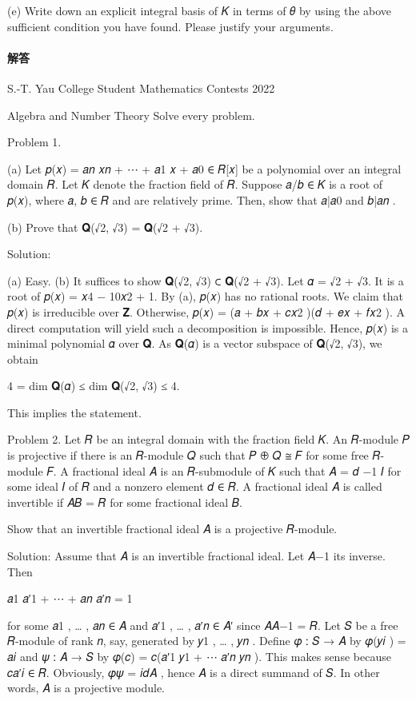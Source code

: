 \documentclass[UTF8,12pt]{ctexart}
\begin{document}
(e) Write down an explicit integral basis of 𝐾 in terms of 𝜃 by using the above sufficient condition you have found. Please justify your arguments.

\paragraph{解答}

S.-T. Yau College Student Mathematics Contests 2022

Algebra and Number Theory Solve every problem.

Problem 1.

(a) Let 𝑝(𝑥) = 𝑎𝑛 𝑥𝑛 + ⋯ + 𝑎1 𝑥 + 𝑎0 ∈ 𝑅[𝑥] be a polynomial over an integral domain 𝑅. Let 𝐾 denote the fraction field of 𝑅. Suppose 𝑎/𝑏 ∈ 𝐾 is a root of 𝑝(𝑥), where 𝑎, 𝑏 ∈ 𝑅 and are relatively prime. Then, show that 𝑎|𝑎0 and 𝑏|𝑎𝑛 .

(b) Prove that 𝐐(√2, √3) = 𝐐(√2 + √3).

Solution:

(a) Easy. (b) It suffices to show 𝐐(√2, √3) ⊂ 𝐐(√2 + √3). Let 𝛼 = √2 + √3. It is a root of 𝑝(𝑥) = 𝑥4 − 10𝑥2 + 1. By (a), 𝑝(𝑥) has no rational roots. We claim that 𝑝(𝑥) is irreducible over 𝐙. Otherwise, 𝑝(𝑥) = (𝑎 + 𝑏𝑥 + 𝑐𝑥2 )(𝑑 + 𝑒𝑥 + 𝑓𝑥2 ). A direct computation will yield such a decomposition is impossible. Hence, 𝑝(𝑥) is a minimal polynomial 𝛼 over 𝐐. As 𝐐(𝛼) is a vector subspace of 𝐐(√2, √3), we obtain

4 = dim 𝐐(𝛼) ≤ dim 𝐐(√2, √3) ≤ 4.

This implies the statement.

Problem 2. Let 𝑅 be an integral domain with the fraction field 𝐾. An 𝑅-module 𝑃 is projective if there is an 𝑅-module 𝑄 such that 𝑃 ⊕ 𝑄 ≅ 𝐹 for some free 𝑅-module 𝐹. A fractional ideal 𝐴 is an 𝑅-submodule of 𝐾 such that 𝐴 = 𝑑 −1 𝐼 for some ideal 𝐼 of 𝑅 and a nonzero element 𝑑 ∈ 𝑅. A fractional ideal 𝐴 is called invertible if 𝐴𝐵 = 𝑅 for some fractional ideal 𝐵.

Show that an invertible fractional ideal 𝐴 is a projective 𝑅-module.

Solution: Assume that 𝐴 is an invertible fractional ideal. Let 𝐴−1 its inverse. Then

𝑎1 𝑎′1 + ⋯ + 𝑎𝑛 𝑎′𝑛 = 1

for some 𝑎1 , … , 𝑎𝑛 ∈ 𝐴 and 𝑎′1 , … , 𝑎′𝑛 ∈ 𝐴′ since 𝐴𝐴−1 = 𝑅. Let 𝑆 be a free 𝑅-module of rank 𝑛, say, generated by 𝑦1 , … , 𝑦𝑛 . Define 𝜑 ∶ 𝑆 → 𝐴 by 𝜑(𝑦𝑖 ) = 𝑎𝑖 and 𝜓 ∶ 𝐴 → 𝑆 by 𝜑(𝑐) = 𝑐(𝑎′1 𝑦1 + ⋯ 𝑎′𝑛 𝑦𝑛 ). This makes sense because 𝑐𝑎′𝑖 ∈ 𝑅. Obviously, 𝜑𝜓 = 𝑖𝑑𝐴 , hence 𝐴 is a direct summand of 𝑆. In other words, 𝐴 is a projective module.
\end{document}
